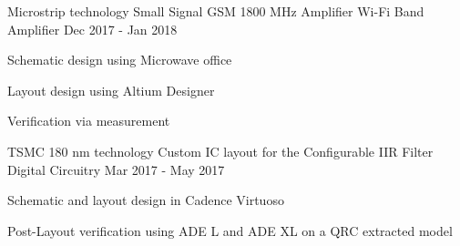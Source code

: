 \begin{cventries}

\cventry
{Microstrip technology} %
{Small Signal GSM 1800 MHz Amplifier} %
{Wi-Fi Band Amplifier} %
{Dec 2017 - Jan 2018} %
{ %
\begin{cvitems}
\item {Schematic design using Microwave office}
\item {Layout design using Altium Designer}
\item {Verification via measurement} %
\end{cvitems}
}


\cventry
{TSMC 180 nm technology} %
{Custom IC layout for the Configurable IIR Filter} %
{Digital Circuitry} %
{Mar 2017 - May 2017} %
{ %
\begin{cvitems}
\item {Schematic and layout design in Cadence Virtuoso}
\item {Post-Layout verification using ADE L and ADE XL on a QRC extracted model}
\end{cvitems}
}



\end{cventries}